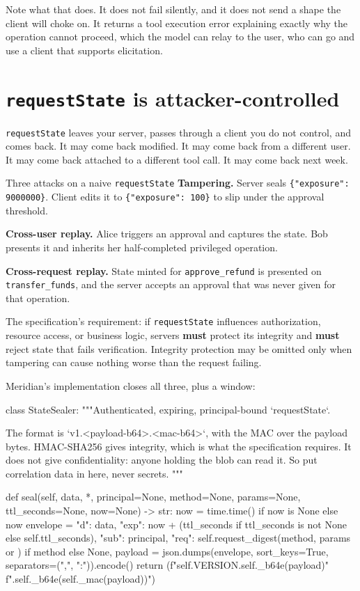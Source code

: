 Note what that does. It does not fail silently, and it does not send a shape the
client will choke on. It returns a tool execution error explaining exactly why
the operation cannot proceed, which the model can relay to the user, who can go
and use a client that supports elicitation.

\section{\texttt{requestState} is attacker-controlled}

\texttt{requestState} leaves your server, passes through a client you do not
control, and comes back. It may come back modified. It may come back from a
different user. It may come back attached to a different tool call. It may come
back next week.

\begin{dangerbox}{Three attacks on a naive \texttt{requestState}}
\textbf{Tampering.} Server seals \texttt{\{"exposure": 9000000\}}. Client edits
it to \texttt{\{"exposure": 100\}} to slip under the approval threshold.

\textbf{Cross-user replay.} Alice triggers an approval and captures the state.
Bob presents it and inherits her half-completed privileged operation.

\textbf{Cross-request replay.} State minted for \texttt{approve\_refund} is
presented on \texttt{transfer\_funds}, and the server accepts an approval that
was never given for that operation.
\end{dangerbox}

The specification's requirement: if \texttt{requestState} influences
authorization, resource access, or business logic, servers \textbf{must} protect
its integrity and \textbf{must} reject state that fails verification. Integrity
protection may be omitted only when tampering can cause nothing worse than the
request failing.

Meridian's implementation closes all three, plus a window:

\begin{py}
class StateSealer:
    """Authenticated, expiring, principal-bound `requestState`.

    The format is `v1.<payload-b64>.<mac-b64>`, with the MAC over the payload
    bytes. HMAC-SHA256 gives integrity, which is what the specification
    requires. It does not give confidentiality: anyone holding the blob can
    read it. So put correlation data in here, never secrets.
    """

    def seal(self, data, *, principal=None, method=None, params=None,
             ttl_seconds=None, now=None) -> str:
        now = time.time() if now is None else now
        envelope = {
            "d": data,
            "exp": now + (ttl_seconds if ttl_seconds is not None
                          else self.ttl_seconds),
            "sub": principal,
            "req": self.request_digest(method, params or {}) if method else None,
        }
        payload = json.dumps(envelope, sort_keys=True,
                             separators=(",", ":")).encode()
        return (f"{self.VERSION}.{self._b64e(payload)}"
                f".{self._b64e(self._mac(payload))}")
\end{py}


